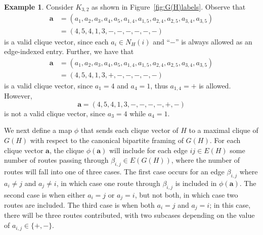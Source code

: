 \documentclass[12pt]{amsart}
\theoremstyle{definition}
\newtheorem{example}[theorem]{Example}
\newcommand\ba{\mathbf{a}}
\begin{document}
\begin{example}\label{ex:k32cliquevectors}
Consider $K_{3,2}$ as shown in Figure~\ref{fig:G(H)labels}.
Observe that
\begin{align*}
\ba&=(a_1,a_2,a_3,a_4,a_5,a_{1,4},a_{1,5},a_{2,4},a_{2,5},a_{3,4},a_{3,5}) \\
&= (4,5,4,1,3,-,-,-,-,-,-)
\end{align*}
is a valid clique vector, since each $a_i\in N_H(i)$ and ``$-$'' is always allowed as an edge-indexed entry. 
Further, we have that
\begin{align*}
\ba&= (a_1,a_2,a_3,a_4,a_5,a_{1,4},a_{1,5},a_{2,4},a_{2,5},a_{3,4},a_{3,5}) \\
&= (4,5,4,1,3,+,-,-,-,-,-)
\end{align*}
is a valid clique vector, since $a_1=4$ and $a_4=1$, thus $a_{1,4}=+$ is allowed.
However,
\[
\ba=(4,5,4,1,3,-,-,-,-,+,-)
\]
is not a valid clique vector, since $a_3=4$ while $a_4=1$.
\end{example}

We next define a map $\phi$ that sends each clique vector of $H$ to a maximal clique of $G(H)$ with respect to the canonical bipartite framing of $G(H)$.
For each clique vector $\ba$, the clique $\phi(\ba)$ will include for each edge $ij\in E(H)$ some number of routes passing through $\beta_{i,j}\in E(G(H))$, where the number of routes will fall into one of three cases.
The first case occurs for an edge $\beta_{i,j}$ where $a_i\neq j$ and $a_j\neq i$, in which case one route through $\beta_{i,j}$ is included in $\phi(\ba)$. 
The second case is when either $a_i=j$ or $a_j=i$, but not both, in which case two routes are included.
The third case is when both $a_i=j$ and $a_j=i$; in this case, there will be three routes contributed, with two subcases depending on the value of $a_{i,j}\in \{+,-\}$.
\end{document}
